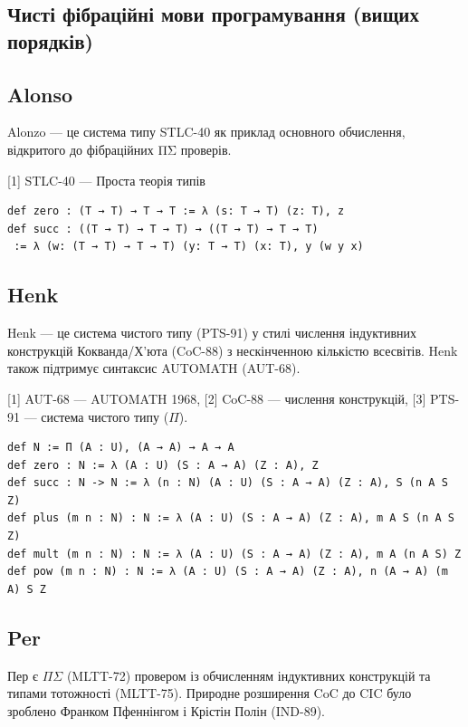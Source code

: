 \newpage
\subsection*{Чисті фібраційні мови програмування (вищих порядків)}

\subsection*{Alonso}

Alonzo — це система типу STLC-40 як приклад основного обчислення,
відкритого до фібраційних ΠΣ проверів.

[1] STLC-40 — Проста теорія типів

\begin{lstlisting}
def zero : (T → T) → T → T := λ (s: T → T) (z: T), z
def succ : ((T → T) → T → T) → ((T → T) → T → T)
 := λ (w: (T → T) → T → T) (y: T → T) (x: T), y (w y x)
\end{lstlisting}

\subsection*{Henk}

Henk — це система чистого типу (PTS-91) у стилі числення індуктивних
конструкцій Кокванда/Х’юта (CoC-88) з нескінченною кількістю всесвітів.
Henk також підтримує синтаксис AUTOMATH (AUT-68).

[1] AUT-68 — AUTOMATH 1968, [2] CoC-88 — числення конструкцій, [3] PTS-91 — система чистого типу ($\Pi$).

\begin{lstlisting}
def N := Π (A : U), (A → A) → A → A
def zero : N := λ (A : U) (S : A → A) (Z : A), Z
def succ : N -> N := λ (n : N) (A : U) (S : A → A) (Z : A), S (n A S Z)
def plus (m n : N) : N := λ (A : U) (S : A → A) (Z : A), m A S (n A S Z)
def mult (m n : N) : N := λ (A : U) (S : A → A) (Z : A), m A (n A S) Z
def pow (m n : N) : N := λ (A : U) (S : A → A) (Z : A), n (A → A) (m A) S Z
\end{lstlisting}

\subsection*{Per}

Пер є $\Pi\Sigma$ (MLTT-72) провером із обчисленням індуктивних конструкцій
та типами тотожності (MLTT-75). Природне розширення CoC до CIC було
зроблено Франком Пфеннінгом і Крістін Полін (IND-89).

